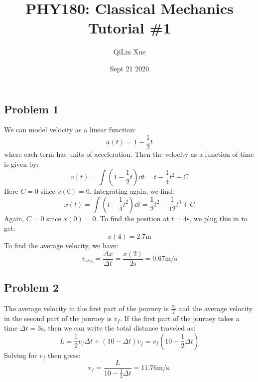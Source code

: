 \documentclass{article}
\title{PHY180: Classical Mechanics \\ Tutorial \#1}
\author{QiLin Xue}
\date{Sept 21 2020}
\begin{document}
\maketitle
\subsection*{Problem 1}
We can model velocity as a linear function:
\begin{equation}
    a(t)=1-\frac{1}{2}t
    \label{eq:}
\end{equation}
where each term has units of acceleration. Then the velocity as a function of time is given by:
\begin{equation}
    v(t) = \int \left(1-\frac{1}{2}t\right)\dd{t} = t-\frac{1}{4}t^2+C
    \label{eq:}
\end{equation}
Here $C=0$ since $v(0)=0$. Integrating again, we find:
\begin{equation}
    x(t) = \int \left(t-\frac{1}{4}t^2\right) \dd{t} = \frac{1}{2}t^2-\frac{1}{12}t^3 + C
    \label{eq:}
\end{equation}
Again, $C=0$ since $x(0)=0$. To find the position at $t=4\si{\second}$, we plug this in to get:
\begin{equation}
    x(4) = 2.7\si{\meter}
    \label{eq:}
\end{equation}
To find the average velocity, we have:
\begin{equation}
    v_\text{avg} = \frac{\Delta x}{\Delta t} = \frac{x(2)}{2\si{\second}} = 0.67\si{\meter\per\second}
    \label{eq:}
\end{equation}
\subsection*{Problem 2}
The average velocity in the first part of the journey is $\frac{v_f}{2}$ and the average velocity in the second part of the journey is $v_f$. If the first part of the journey takes a time $\Delta t=3\si{\second}$, then we can write the total distance traveled as:
\begin{equation}
    L=\frac{1}{2}v_f\Delta t + (10-\Delta t)v_f = v_f\left(10-\frac{1}{2}\Delta t\right)
    \label{eq:}
\end{equation}
Solving for $v_f$ then gives:
\begin{equation}
    v_f=\frac{L}{10-\frac{1}{2}\Delta t} = 11.76\si{\meter\per\second}.
    \label{eq:}
\end{equation}
\end{document}
